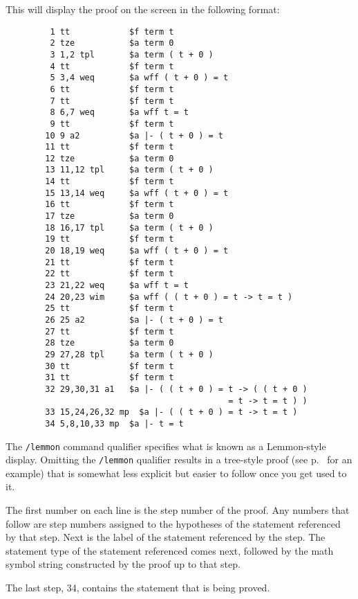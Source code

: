 This will display the proof on the screen in the following format:
\begin{verbatim}
         1 tt            $f term t
         2 tze           $a term 0
         3 1,2 tpl       $a term ( t + 0 )
         4 tt            $f term t
         5 3,4 weq       $a wff ( t + 0 ) = t
         6 tt            $f term t
         7 tt            $f term t
         8 6,7 weq       $a wff t = t
         9 tt            $f term t
        10 9 a2          $a |- ( t + 0 ) = t
        11 tt            $f term t
        12 tze           $a term 0
        13 11,12 tpl     $a term ( t + 0 )
        14 tt            $f term t
        15 13,14 weq     $a wff ( t + 0 ) = t
        16 tt            $f term t
        17 tze           $a term 0
        18 16,17 tpl     $a term ( t + 0 )
        19 tt            $f term t
        20 18,19 weq     $a wff ( t + 0 ) = t
        21 tt            $f term t
        22 tt            $f term t
        23 21,22 weq     $a wff t = t
        24 20,23 wim     $a wff ( ( t + 0 ) = t -> t = t )
        25 tt            $f term t
        26 25 a2         $a |- ( t + 0 ) = t
        27 tt            $f term t
        28 tze           $a term 0
        29 27,28 tpl     $a term ( t + 0 )
        30 tt            $f term t
        31 tt            $f term t
        32 29,30,31 a1   $a |- ( ( t + 0 ) = t -> ( ( t + 0 )
                                             = t -> t = t ) )
        33 15,24,26,32 mp  $a |- ( ( t + 0 ) = t -> t = t )
        34 5,8,10,33 mp  $a |- t = t
\end{verbatim}

The \texttt{/lemmon} command qualifier specifies what is known as a Lemmon-style
display.  Omitting the
\texttt{/lemmon} qualifier results in a tree-style proof (see
p.~\pageref{treeproof} for an example) that is somewhat less explicit but
easier to follow once you get used to it.

The first number on each line is the step
number of the proof.  Any numbers that follow are step numbers assigned to the
hypotheses of the statement referenced by that step.  Next is the label of
the statement referenced by the step.  The statement type of the statement
referenced comes next, followed by the math symbol string
constructed by the proof up to that step.

The last step, 34, contains the statement that is being proved.

